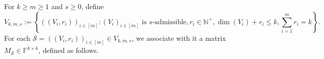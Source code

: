 \documentclass[11pt]{article}
\theoremstyle{plain}
\theoremstyle{definition}
\theoremstyle{remark}
\newcommand{\F}{\mathbb{F}}
\newcommand{\cS}{\mathcal{S}}
\begin{document}
%
%

For $k\geq m\geq 1$ and $s\geq 0$, define 
\[
V_{k,m,s}:=\left\{((V_i,r_i))_{i\in [m]}: (V_i)_{i\in [m]}\text{ is $s$-admissible},r_i\in \mathbb{N}^+,\dim(V_i)+r_i\leq k,\sum_{i=1}^m r_i=k\right\}.
\] 
For each $\cS=((V_i,r_i))_{i\in [m]}\in V_{k,m,s}$, we associate with it a matrix $M_{\cS}\in \F^{k\times k}$, defined as follows.
\end{document}
